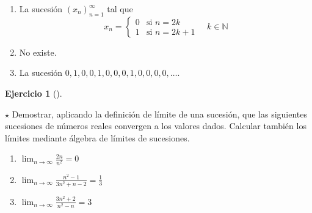 \documentclass[
  spanish,
  a4paper,
]{scrreport}
\providecommand{\tightlist}{%
  \setlength{\itemsep}{0pt}\setlength{\parskip}{0pt}}
\theoremstyle{definition}
\newtheorem{exercise}{Ejercicio}[chapter]
\theoremstyle{remark}
\begin{document}
\begin{tcolorbox}[enhanced jigsaw, arc=.35mm, bottomrule=.15mm, bottomtitle=1mm, breakable, colback=white, colbacktitle=quarto-callout-tip-color!10!white, colframe=quarto-callout-tip-color-frame, coltitle=black, left=2mm, leftrule=.75mm, opacityback=0, opacitybacktitle=0.6, rightrule=.15mm, title=\textcolor{quarto-callout-tip-color}{\faLightbulb}\hspace{0.5em}{Solución}, titlerule=0mm, toprule=.15mm, toptitle=1mm]

\begin{enumerate}
\def\labelenumi{\alph{enumi}.}
\tightlist
\item
  La sucesión \((x_n)_{n=1}^\infty\) tal que \[x_n=\begin{cases}
  0 & \mbox{si } n=2k\\ 
  1 & \mbox{si } n=2k+1
  \end{cases}
  \quad k\in\mathbb{N}
  \]
\item
  No existe.
\item
  La sucesión \(0, 1, 0, 0, 1, 0, 0, 0, 1, 0, 0, 0, 0, \ldots\).
\end{enumerate}

\end{tcolorbox}

\begin{exercise}[]\protect\hypertarget{exr-limites-sucesiones}{}\label{exr-limites-sucesiones}

\(\star\) Demostrar, aplicando la definición de límite de una sucesión,
que las siguientes sucesiones de números reales convergen a los valores
dados. Calcular también los límites mediante álgebra de límites de
sucesiones.

\begin{enumerate}
\def\labelenumi{\alph{enumi}.}
\item
  \(\lim_{n\to\infty}\frac{2n}{n^2}=0\)
\item
  \(\lim_{n\to\infty}\frac{n^2-1}{3n^2+n-2}=\frac{1}{3}\)
\item
  \(\lim_{n\to\infty}\frac{3n^2+2}{n^2-n}=3\)
\end{enumerate}

\end{exercise}
\end{document}
